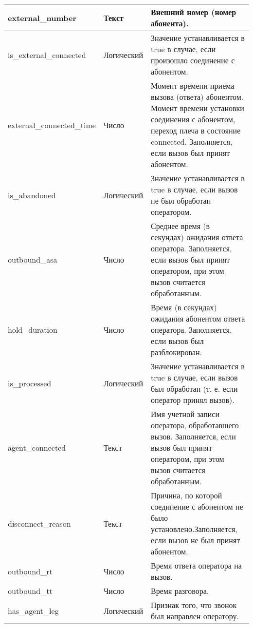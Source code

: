 \begin{small}
\begin{longtable}{|p{}|p{}|p{}|}
        external\_number &
        Текст &
                Внешний номер (номер абонента).\\
\hline
        is\_external\_connected &
        Логический &
                Значение устанавливается в true в случае, если произошло соединение с абонентом.\\
\hline
        external\_connected\_time &
        Число &
                Момент времени приема вызова (ответа) абонентом. Момент времени установки соединения с абонентом, переход плеча в состояние connected. Заполняется, если вызов был принят абонентом.\\
\hline
        is\_abandoned &
        Логический &
                Значение устанавливается в true в случае, если вызов не был обработан оператором.\\
\hline
        outbound\_asa &
        Число &
                Среднее время (в секундах) ожидания ответа оператора. Заполняется, если вызов был принят оператором, при этом вызов считается обработанным.\\
\hline
        hold\_duration &
        Число &
                Время (в секундах) ожидания абонентом ответа оператора. Заполняется, если вызов был разблокирован.\\
\hline
        is\_processed &
        Логический &
                Значение устанавливается в true в случае, если вызов был обработан (т. е. если оператор принял вызов).\\
\hline
        agent\_connected &
        Текст &
                Имя учетной записи оператора, обработавшего вызов. Заполняется, если вызов был принят оператором, при этом вызов считается обработанным.\\
\hline
        disconnect\_reason &
        Текст &
                Причина, по которой соединение с абонентом не было установлено.Заполняется, если вызов не был принят абонентом.\\
\hline
        outbound\_rt &
        Число &
                Время ответа оператора на вызов.\\
\hline
        outbound\_tt &
        Число &
                Время разговора.\\
\hline
        has\_agent\_leg &
        Логический &
                Признак того, что звонок был направлен оператору. \\
    \end{longtable}
\end{small}

